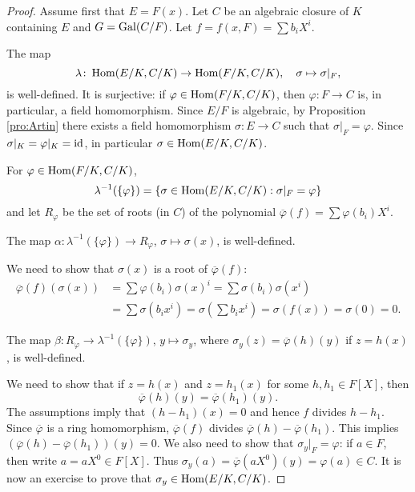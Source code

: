  \begin{proof}
    Assume first that $E=F(x)$. 
    Let $C$ be an algebraic closure of $K$ containing $E$ 
    and $G=\operatorname{Gal}(C/F)$. Let $f=f(x,F)=\sum b_iX^i$.
    
    The map
    \[
    \lambda\colon \operatorname{Hom}(E/K,C/K)\to\operatorname{Hom}(F/K,C/K),\quad
    \sigma\mapsto\sigma|_F,
    \]
    is well-defined. 
    It is surjective: 
    if $\varphi\in\operatorname{Hom}(F/K,C/K)$, then $\varphi\colon F\to C$ is, 
    in particular, a field homomorphism. Since $E/F$ is algebraic, by Proposition \ref{pro:Artin} 
    there exists a field homomorphism 
    $\sigma\colon E\to C$ such that $\sigma|_F=\varphi$. Since $\sigma|_K=\varphi|_K=\operatorname{id}$, in particular 
    $\sigma\in\operatorname{Hom}(E/K,C/K)$. 
    
    For $\varphi\in\operatorname{Hom}(F/K,C/K)$,  
    \[
    \lambda^{-1}(\{\varphi\})=\{\sigma\in\operatorname{Hom}(E/K,C/K):\sigma|_F=\varphi\}
    \]
    and let $R_\varphi$ be the set of roots (in $C$) of the polynomial $\overline{\varphi}(f)=\sum\varphi(b_i)X^i$. 
    
    \begin{claim}
        The map $\alpha\colon \lambda^{-1}(\{\varphi\})\to R_{\varphi}$, $\sigma\mapsto\sigma(x)$, is well-defined. 
    \end{claim}
    
    We need to show that $\sigma(x)$ is a root of $\overline{\varphi}(f)$:
    \begin{align*}
    \overline{\varphi}(f)(\sigma(x))&=\sum \varphi(b_i)\sigma(x)^i
    =\sum\sigma(b_i)\sigma(x^i)\\
    &=\sum\sigma(b_ix^i)=\sigma\left(\sum b_ix^i\right)=\sigma(f(x))=\sigma(0)=0.
    \end{align*}
    
    \begin{claim}
    The map $\beta\colon R_{\varphi}\to \lambda^{-1}(\{\varphi\})$, $y\mapsto\sigma_y$, 
    where $\sigma_y(z)=\overline{\varphi}(h)(y)$
    if $z=h(x)$, is well-defined. 
    \end{claim}
    
    We need to show that if $z=h(x)$ and 
    $z=h_1(x)$ for some $h,h_1\in F[X]$, then 
    \[
    \overline{\varphi}(h)(y)=\overline{\varphi}(h_1)(y).
    \]
    The assumptions imply that 
    $(h-h_1)(x)=0$ and hence $f$ divides $h-h_1$. Since
    $\overline{\varphi}$ is a ring homomorphism, 
    $\overline{\varphi}(f)$ divides $\overline{\varphi}(h)-\overline{\varphi}(h_1)$. 
    This implies $(\overline{\varphi}(h)-\overline{\varphi}(h_1))(y)=0$. We also need to show that 
    $\sigma_y|_F=\varphi$: if $a\in F$, then 
    write $a=aX^0\in F[X]$. Thus 
    $\sigma_y(a)=\overline{\varphi}(aX^0)(y)=\varphi(a)\in C$. 
    It is now an exercise to prove that $\sigma_y\in\operatorname{Hom}(E/K,C/K)$. 
    

\end{proof}

